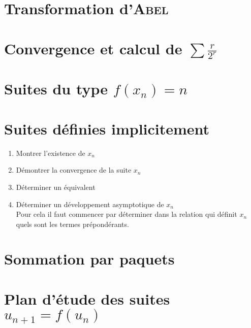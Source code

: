 \section{Transformation d'\textsc{Abel}} \label{transformation_abel}


\section{Convergence et calcul de  \texorpdfstring{$\sum \frac{r}{2^r}$}{de la série de terme général r/2^r}}


\section{Suites du type \texorpdfstring{$f(x_n) = n$}{f(x_n) = n}}


\section{Suites définies implicitement}

\begin{methode}
    \begin{enumerate}
        \item Montrer l'existence de $x_n$
        \item Démontrer la convergence de la suite $x_n$
        \item Déterminer un équivalent 
        \item Déterminer un développement asymptotique de $x_n$ \\
        Pour cela il faut commencer par déterminer dans la relation qui définit $x_n$ quels sont les termes prépondérants. 
    \end{enumerate}
\end{methode}

\section{Sommation par paquets}


\section{Plan d'étude des suites \texorpdfstring{$u_{n+1} = f(u_n)$}{u_(n+1) = f(u_n)}}

